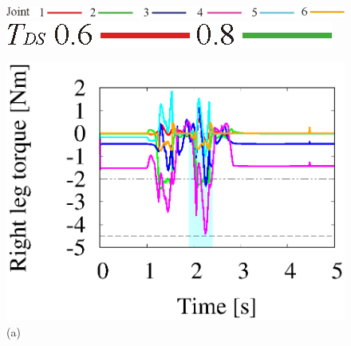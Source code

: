 \documentclass[twocolumn]{jsarticle}
\begin{document}
\begin{figure}[h]
  \begin{minipage}{0.5\linewidth}
    \centering
    \includegraphics[width=1.0\linewidth]{./fig/key6leg.eps}
  \end{minipage}
   \begin{minipage}{0.001\hsize}
        \hspace{0.02mm}
      \end{minipage}
  \begin{minipage}{0.28\linewidth}
    \centering
    \includegraphics[width=1.0\linewidth]{./fig/keyV2.eps}
 \end{minipage}
    \begin{minipage}{0.001\hsize}
        \hspace{0.02mm}
      \end{minipage}
  \begin{minipage}{0.48\linewidth}
    \centering
    \includegraphics[width=1.0\linewidth]{./fig/original.eps}
     \footnotesize{\hspace{30pt}(a)}
  \end{minipage}
    \begin{minipage}{0.49\linewidth}
    \centering

\end{minipage}
\end{figure}
\end{document}
